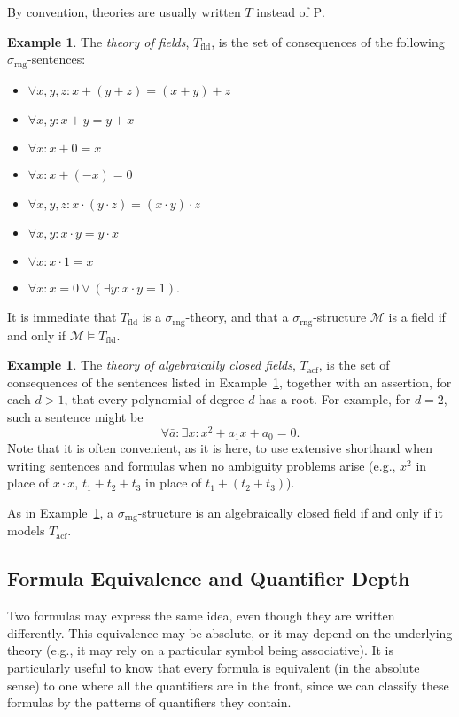 \documentclass{article}
\theoremstyle{plain}
\theoremstyle{definition}
\newtheorem{example}[thm]{Example}
\newcommand{\defterm}{\emph}
\newcommand{\ringsig}{\sigma_{\operatorname{rng}}}
\newcommand{\fieldthy}{T_{\operatorname{fld}}}
\newcommand{\acf}{T_{\operatorname{acf}}}
\newcommand{\tuple}{\bar}
\newcommand{\Rho}{\mathrm{P}}
\begin{document}
By convention, theories are usually written $T$ instead of $\Rho$.

\begin{example}\label{example:fieldthy}
  The \defterm{theory of fields}, $\fieldthy$, is the set of consequences of
  the following $\ringsig$-sentences:
  \begin{itemize}
  \item $\forall x,y,z: x + (y + z) = (x + y) + z$
  \item $\forall x,y: x + y = y + x$
  \item $\forall x: x + 0 = x$
  \item $\forall x: x + (-x) = 0$
  \item $\forall x,y,z: x \cdot (y \cdot z) = (x \cdot y) \cdot z$
  \item $\forall x,y: x \cdot y = y \cdot x$
  \item $\forall x: x \cdot 1 = x$
  \item $\forall x: x = 0 \vee (\exists y: x \cdot y = 1)$.
  \end{itemize}
  
  It is immediate that $\fieldthy$ is a $\ringsig$-theory, and that a
  $\ringsig$-structure $\mathcal{M}$ is a field if and only if
  $\mathcal{M} \models \fieldthy$.
\end{example}

\begin{example}
  The \defterm{theory of algebraically closed fields}, $\acf$, is the
  set of consequences of the sentences listed in
  Example~\ref{example:fieldthy}, together with an assertion, for each
  $d > 1$, that every polynomial of degree $d$ has a root. For
  example, for $d = 2$, such a sentence might be $$\forall \tuple{a}:
  \exists x: x^2 + a_1x + a_0 = 0 \text{.}$$ Note that it is often
  convenient, as it is here, to use extensive shorthand when writing
  sentences and formulas when no ambiguity problems arise (e.g., $x^2$
  in place of $x \cdot x$, $t_1 + t_2 + t_3$ in place of $t_1 + (t_2 +
  t_3)$).

  As in Example~\ref{example:fieldthy}, a $\ringsig$-structure is an
  algebraically closed field if and only if it models $\acf$.
\end{example}

\subsection{Formula Equivalence and Quantifier Depth}

Two formulas may express the same idea, even though they are written
differently. This equivalence may be absolute, or it may depend on the
underlying theory (e.g., it may rely on a particular symbol being
associative). It is particularly useful to know that every formula is
equivalent (in the absolute sense) to one where all the quantifiers
are in the front, since we can classify these formulas by the patterns
of quantifiers they contain.
\end{document}
